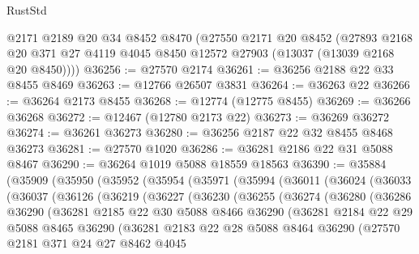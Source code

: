 \begin{lexlean}{RustStd}
\begin{coremodule}
    @2171
    @2189
    @20
    @34
    @8452
    @8470
    (@27550
      @2171
      @20
      @8452
      (@27893 @2168 @20 @371 @27 @4119 @4045 @8450 @12572 @27903 (@13037 (@13039 @2168 @20 @8450))))
@36256 := @27570 @2174
@36261 := @36256 @2188 @22 @33 @8455 @8469
@36263 := @12766 @26507 @3831
@36264 := @36263 @22
@36266 := @36264 @2173 @8455
@36268 := @12774 (@12775 @8455)
@36269 := @36266 @36268
@36272 := @12467 (@12780 @2173 @22)
@36273 := @36269 @36272
@36274 := @36261 @36273
@36280 := @36256 @2187 @22 @32 @8455 @8468 @36273
@36281 := @27570 @1020
@36286 := @36281 @2186 @22 @31 @5088 @8467
@36290 := @36264 @1019 @5088 @18559 @18563
@36390 := @35884
    (@35909
      (@35950
        (@35952
          (@35954
            (@35971
              (@35994
                (@36011
                  (@36024
                    (@36033
                      (@36037
                        (@36126
                          (@36219
                            (@36227
                              (@36230
                                (@36255
                                  (@36274
                                    (@36280
                                      (@36286
                                        @36290
                                        (@36281
                                          @2185
                                          @22
                                          @30
                                          @5088
                                          @8466
                                          @36290
                                          (@36281
                                            @2184
                                            @22
                                            @29
                                            @5088
                                            @8465
                                            @36290
                                            (@36281
                                              @2183
                                              @22
                                              @28
                                              @5088
                                              @8464
                                              @36290
                                              (@27570
                                                @2181
                                                @371
                                                @24
                                                @27
                                                @8462
                                                @4045

\end{coremodule}
\end{lexlean}
